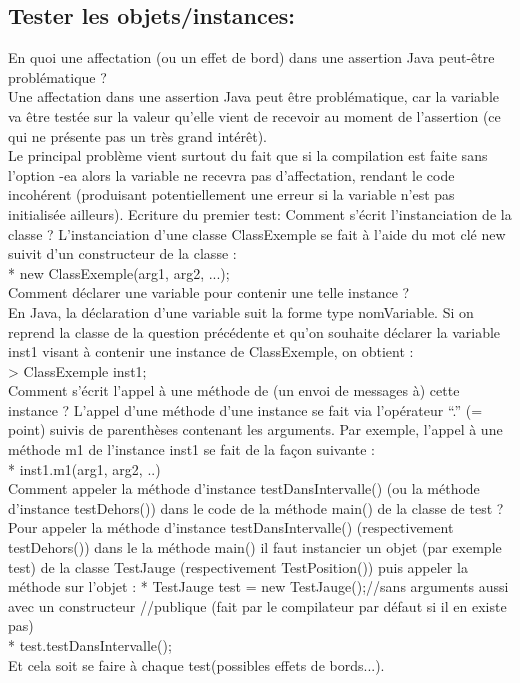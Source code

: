 \documentclass{article}
\begin{document}
\subsection{Tester les objets/instances:}
En quoi une affectation (ou un effet de bord) dans une assertion Java peut-être
problématique ? \\
Une affectation dans une assertion Java peut être problématique, car la variable va être
testée sur la valeur qu’elle vient de recevoir au moment de l’assertion (ce qui ne présente pas un très grand intérêt).\\
Le principal problème vient surtout du fait que si la compilation est faite sans l’option -ea alors la variable ne recevra pas d’affectation, rendant le code incohérent (produisant potentiellement une erreur si la variable n’est pas initialisée ailleurs).
 Ecriture du premier test:
Comment s’écrit l’instanciation de la classe ?
L’instanciation d’une classe ClassExemple se fait à l’aide du mot clé new suivit d’un
constructeur de la classe :\\
* new ClassExemple(arg1, arg2, ...);\\
Comment déclarer une variable pour contenir une telle instance ?\\
En Java, la déclaration d’une variable suit la forme type nomVariable. Si on reprend la
classe de la question précédente et qu’on souhaite déclarer la variable inst1 visant à
contenir une instance de ClassExemple, on obtient :\\
> ClassExemple inst1;\\
Comment s’écrit l’appel à une méthode de (un envoi de messages à) cette instance ?
L’appel d’une méthode d’une instance se fait via l’opérateur “.” (= point) suivis de
parenthèses contenant les arguments. Par exemple, l’appel à une méthode m1 de l’instance
inst1 se fait de la façon suivante :\\
* inst1.m1(arg1, arg2, ..)\\
Comment appeler la méthode d’instance testDansIntervalle() (ou la méthode d’instance
testDehors()) dans le code de la méthode main() de la classe de test ?\\
Pour appeler la méthode d’instance testDansIntervalle() (respectivement
testDehors()) dans le la méthode main() il faut instancier un objet (par exemple test)
de la classe TestJauge (respectivement TestPosition()) puis appeler la méthode sur
l’objet :
* TestJauge test = new TestJauge();//sans arguments aussi avec un constructeur
//publique (fait par le compilateur par défaut si il en existe pas)\\
* test.testDansIntervalle();\\
Et cela soit se faire à chaque test(possibles effets de bords...).
\newline
\end{document}
